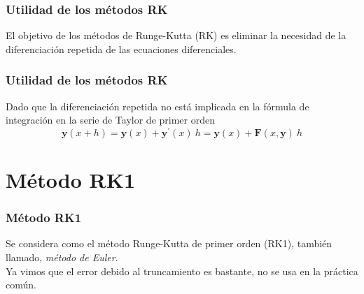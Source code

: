 \begin{frame}
\frametitle{Utilidad de los métodos RK}
El objetivo de los métodos de Runge-Kutta (RK) es eliminar la necesidad de la diferenciación repetida de las ecuaciones diferenciales. 
\end{frame}
\begin{frame}
\frametitle{Utilidad de los métodos RK}
Dado que la diferenciación repetida no está implicada en la fórmula de integración en la serie de Taylor de primer orden
\[ \mathbf{y}(x + h) = \mathbf{y}(x) + \mathbf{y}^{\prime}(x) \: h = \mathbf{y}(x) + \mathbf{F}(x,\mathbf{y}) \: h \]
\end{frame}
\section{Método RK1}
\begin{frame}
\frametitle{Método RK1}
Se considera como el método Runge-Kutta de primer orden (RK1), también llamado, \emph{método de Euler}. 
\\
\bigskip
Ya vimos que el error debido al truncamiento es bastante, no se usa en la práctica común.
\end{frame}
